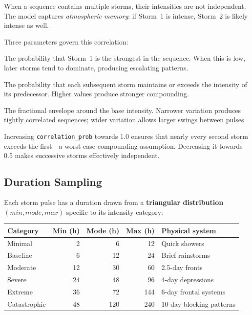 \documentclass[11pt,a4paper]{article}
\begin{document}
When a sequence contains multiple storms, their intensities are not
independent.  The model captures \emph{atmospheric memory}: if Storm~1
is intense, Storm~2 is likely intense as well.

Three parameters govern this correlation:

\begin{description}[leftmargin=2em]
  \item[\texttt{first\_storm\_dominant\_prob} (default 0.30)] The
        probability that Storm~1 is the strongest in the sequence.
        When this is low, later storms tend to dominate, producing
        escalating patterns.
  \item[\texttt{correlation\_prob} (default 0.70)] The probability
        that each subsequent storm maintains or exceeds the intensity
        of its predecessor.  Higher values produce stronger compounding.
  \item[\texttt{intensity\_variation} (default $\pm$0.20)] The
        fractional envelope around the base intensity.  Narrower
        variation produces tightly correlated sequences; wider variation
        allows larger swings between pulses.
\end{description}

\noindent Increasing \texttt{correlation\_prob} towards 1.0 ensures that
nearly every second storm exceeds the first---a worst-case compounding
assumption.  Decreasing it towards 0.5 makes successive storms effectively
independent.

\subsection{Duration Sampling}

Each storm pulse has a duration drawn from a \textbf{triangular
distribution} $(min, mode, max)$ specific to its intensity category:

\begin{center}
\begin{tabular}{lrrrl}
\toprule
\textbf{Category} & \textbf{Min (h)} & \textbf{Mode (h)} & \textbf{Max (h)} & \textbf{Physical system} \\
\midrule
Minimal       &  2 &   6 &  12 & Quick showers \\
Baseline      &  6 &  12 &  24 & Brief rainstorms \\
Moderate      & 12 &  30 &  60 & 2.5-day fronts \\
Severe        & 24 &  48 &  96 & 4-day depressions \\
Extreme       & 36 &  72 & 144 & 6-day frontal systems \\
Catastrophic  & 48 & 120 & 240 & 10-day blocking patterns \\
\bottomrule
\end{tabular}
\end{center}
\end{document}
